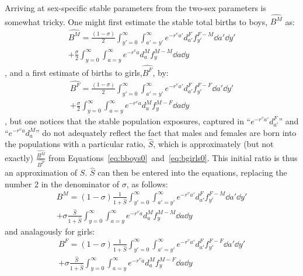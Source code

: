 Arriving at sex-specific stable parameters from the two-sex parameters is
somewhat tricky. One might first estimate the stable total births to boys,
$\widehat{B^M}$ as:
\begin{equation}
\begin{split}
\label{eq:bboys0}
\widehat{B^M} = \frac{(1-\sigma)}{2} \int _{y'=0}^\infty \int _{a'=y'}^\infty
e^{-r^\upsilon a'} d_{a'}^F f_{y'}^{F-M} \dd a' \dd y' \\
+ \frac{\sigma}{2} \int _{y=0}^\infty \int _{a=y}^\infty e^{-r^\upsilon a}
d_{a}^M f_{y}^{M-M} \dd a \dd y
\end{split}
\end{equation}
, and a first estimate of births to girls,$\widehat{B^F}$, by:
\begin{equation}
\begin{split}
\label{eq:bgirls0}
\widehat{B^F} = \frac{(1-\sigma)}{2} \int _{y'=0}^\infty \int _{a'=y'}^\infty
e^{-r^\upsilon a'} d_{a'}^F f_{y'}^{F-F} \dd a' \dd y' \\
+ \frac{\sigma}{2} \int _{y=0}^\infty \int _{a=y}^\infty e^{-r^\upsilon a}
d_{a}^M f_{y}^{M-F} \dd a \dd y
\end{split}
\end{equation}
, but one notices that the stable population exposures, captured in
``$e^{-r^\upsilon a'} d_{a'}^F$'' and ``$e^{-r^\upsilon a}d_{a}^M$'' do not
adequately reflect the fact that males and females are born into the populations with a particular ratio, $\hat{S}$,
which is approximately (but not exactly) $\frac{\widehat{B^M}}{\widehat{B^F}}$ from
Equations~\eqref{eq:bboys0}~and~\eqref{eq:bgirls0}. This initial ratio is thus
an approximation of $S$. $\hat{S}$ can then be entered into the equations,
replacing the number 2 in the denominator of $\sigma$, as follows:
\begin{equation}
\begin{split}
\label{eq:bboys0}
B^M = (1-\sigma) \frac{1}{1+\hat{S}} \int _{y'=0}^\infty \int
_{a'=y'}^\infty e^{-r^\upsilon a'} d_{a'}^F f_{y'}^{F-M} \dd a' \dd y' \\
+ \sigma \frac{\hat{S}}{1+\hat{S}} \int _{y=0}^\infty \int _{a=y}^\infty
e^{-r^\upsilon a} d_{a}^M f_{y}^{M-M} \dd a \dd y
\end{split}
\end{equation}
and analagously for girls:
\begin{equation}
\begin{split}
\label{eq:bgirls0}
B^F = (1-\sigma)\frac{1}{1+\hat{S}}\int _{y'=0}^\infty \int _{a'=y'}^\infty
e^{-r^\upsilon a'} d_{a'}^F f_{y'}^{F-F} \dd a' \dd y' \\
+ \sigma \frac{\hat{S}}{1+\hat{S}}\int _{y=0}^\infty \int _{a=y}^\infty
e^{-r^\upsilon a} d_{a}^M f_{y}^{M-F} \dd a \dd y
\end{split}
\end{equation}
